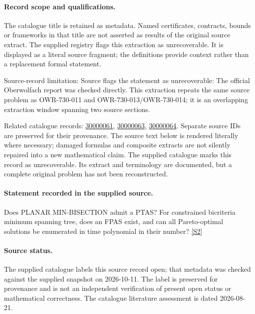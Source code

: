 \documentclass[11pt]{article}
\begin{document}
\paragraph{Record scope and qualifications.}
The catalogue title is retained as metadata. Named certificates, contracts, bounds or frameworks in that title are not asserted as results of the original source extract.
The supplied registry flags this extraction as unrecoverable. It is displayed as a literal source fragment; the definitions provide context rather than a replacement formal statement.

Source-record limitation: Source flags the statement as unrecoverable: The official Oberwolfach report was checked directly. This extraction repeats the same source problem as OWR-730-011 and OWR-730-013/OWR-730-014; it is an overlapping extraction window spanning two source sections.

Related catalogue records: \href{https://mehmetmars7.github.io/Erdosproblems-llm-hunter/problem.html?type=open_problems&id=30000061}{30000061}, \href{https://mehmetmars7.github.io/Erdosproblems-llm-hunter/problem.html?type=open_problems&id=30000063}{30000063}, \href{https://mehmetmars7.github.io/Erdosproblems-llm-hunter/problem.html?type=open_problems&id=30000064}{30000064}. Separate source IDs are preserved for their provenance.
The source text below is rendered literally where necessary; damaged formulas and composite extracts are not silently repaired into a new mathematical claim.
The supplied catalogue marks this record as unrecoverable. Its extract and terminology are documented, but a complete original problem has not been reconstructed.
\paragraph{Statement recorded in the supplied source.}
Does PLANAR MIN-BISECTION admit a PTAS? For constrained bicriteria minimum spanning tree, does an FPAS exist, and can all Pareto-optimal solutions be enumerated in time polynomial in their number? \href{https://doi.org/10.4171/owr/2004/28}{[S2]}
\paragraph{Source status.}
The supplied catalogue labels this source record open; that metadata was checked against the supplied snapshot on 2026-10-11. The label is preserved for provenance and is not an independent verification of present open status or mathematical correctness. The catalogue literature assessment is dated 2026-08-21.
\end{document}
